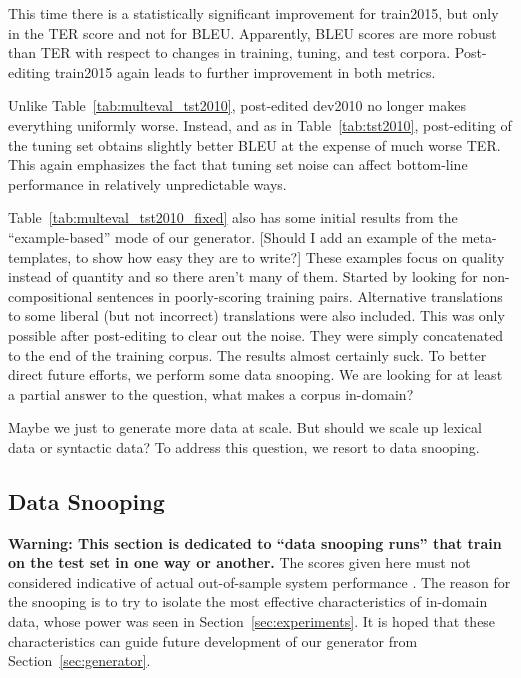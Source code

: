 {%

This time there is a statistically significant improvement for train2015, but only in the TER score and not for BLEU.
Apparently, BLEU scores are more robust than TER with respect to changes in training, tuning, and test corpora.
Post-editing train2015 again leads to further improvement in both metrics.

Unlike Table~\ref{tab:multeval_tst2010}, post-edited dev2010 no longer makes everything uniformly worse. 
Instead, and as in Table~\ref{tab:tst2010}, post-editing of the tuning set obtains slightly better BLEU at the expense of much worse TER. 
This again emphasizes the fact that tuning set noise can affect bottom-line performance in relatively unpredictable ways.

Table~\ref{tab:multeval_tst2010_fixed} also has some initial results from the ``example-based'' mode of our generator.
[Should I add an example of the meta-templates, to show how easy they are to write?]
These examples focus on quality instead of quantity and so there aren't many of them.
Started by looking for non-compositional sentences in poorly-scoring training pairs.
Alternative translations to some liberal (but not incorrect) translations were also included.
This was only possible after post-editing to clear out the noise.
They were simply concatenated to the end of the training corpus.
The results almost certainly suck.
To better direct future efforts, we perform some data snooping.
We are looking for at least a partial answer to the question, what makes a corpus in-domain?

Maybe we just to generate more data at scale. 
But should we scale up lexical data or syntactic data? 
To address this question, we resort to data snooping.


\subsection{Data Snooping}
\textbf{Warning: This section is dedicated to ``data snooping runs'' that train on the test set in one way or another.}
The scores given here must not considered indicative of actual out-of-sample system performance .
The reason for the snooping is to try to isolate the most effective characteristics of in-domain data, whose power was seen in Section~\ref{sec:experiments}.
It is hoped that these characteristics can guide future development of our generator from Section~\ref{sec:generator}.

}
